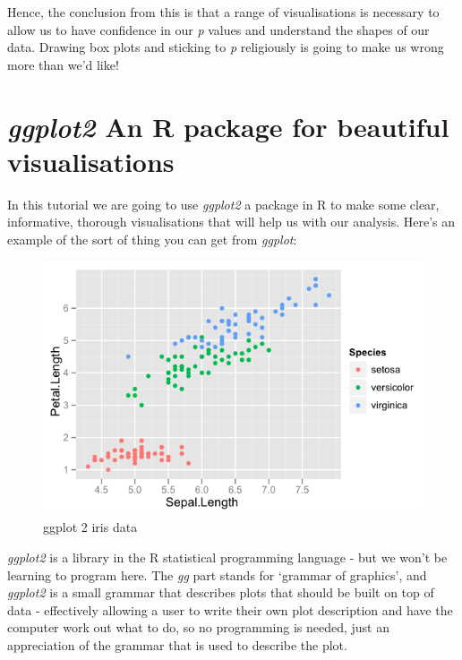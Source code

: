 \documentclass[
]{book}
\begin{document}
Hence, the conclusion from this is that a range of visualisations is necessary to allow us to have confidence in our \emph{p} values and understand the shapes of our data. Drawing box plots and sticking to \emph{p} religiously is going to make us wrong more than we'd like!

\hypertarget{ggplot2-an-r-package-for-beautiful-visualisations}{%
\section{\texorpdfstring{\emph{ggplot2} An R package for beautiful visualisations}{ggplot2 An R package for beautiful visualisations}}\label{ggplot2-an-r-package-for-beautiful-visualisations}}

In this tutorial we are going to use \emph{ggplot2} a package in R to make some clear, informative, thorough visualisations that will help us with our analysis. Here's an example of the sort of thing you can get from \emph{ggplot}:

\begin{figure}
\centering
\includegraphics{fig/sepal-vs-petal-specied.png}
\caption{ggplot 2 iris data}
\end{figure}

\emph{ggplot2} is a library in the R statistical programming language - but we won't be learning to program here. The \emph{gg} part stands for `grammar of graphics', and \emph{ggplot2} is a small grammar that describes plots that should be built on top of data - effectively allowing a user to write their own plot description and have the computer work out what to do, so no programming is needed, just an appreciation of the grammar that is used to describe the plot.
\end{document}
